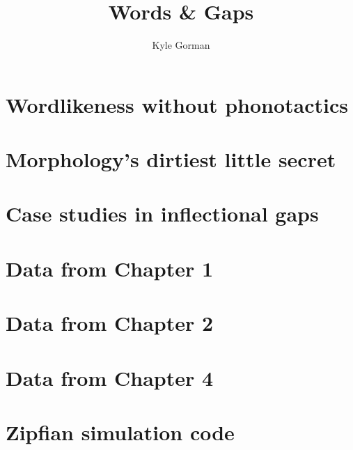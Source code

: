 \documentclass{upenndiss}
\title{Words \& Gaps}
\author{Kyle Gorman}
\begin{document}
\frenchspacing

\FrontMatter



\chapter{Wordlikeness without phonotactics}


\chapter{Morphology's dirtiest little secret}


\chapter{Case studies in inflectional gaps}


\appendix

\chapter{Data from Chapter 1}


\chapter{Data from Chapter 2}


\chapter{Data from Chapter 4}
\lipsum


\chapter{Zipfian simulation code}

\lstset{language=Python, basicstyle=\scriptsize\ttfamily, showstringspaces=false, upquote=false}




\end{document}
